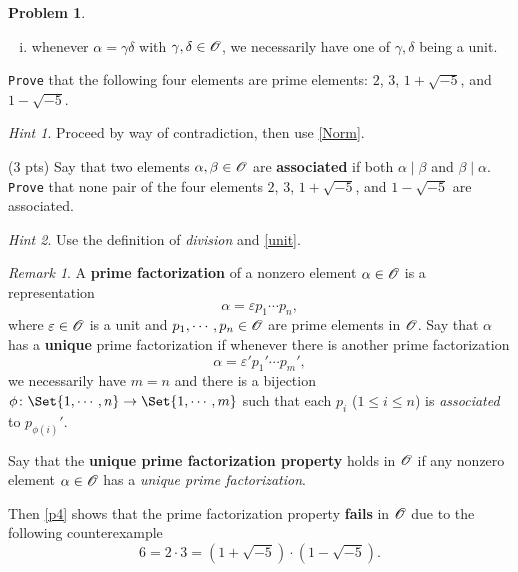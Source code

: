 \documentclass[11pt]{article}
\theoremstyle{plain}
\theoremstyle{definition}
\newtheorem{problem}{Problem}
\theoremstyle{remark}
\newtheorem*{remark}{Remark}
\newtheorem*{hint}{Hint}
\numberwithin{equation}{problem}
\begin{document}
\begin{problem}
\begin{listinprob}
\begin{enumerate}[(i)]
			\item whenever $\alpha=\gamma\delta$ with $\gamma, \delta \in \mathscr{O}$, we necessarily have one of $\gamma, \delta$ being a unit.
		\end{enumerate}
		\texttt{Prove} that the following four elements are prime elements: $2$, $3$, $1+\sqrt{-5}$, and $1-\sqrt{-5}$.
		\begin{hint}
			Proceed by way of contradiction, then use \cref{Norm}.
		\end{hint}
		\item (3 pts) Say that two elements $\alpha,\beta\in\mathscr{O}$ are \textbf{associated} if both $\alpha\mid\beta$ and $\beta\mid\alpha$. 
		\texttt{Prove} that none pair of the four elements $2$, $3$, $1+\sqrt{-5}$, and $1-\sqrt{-5}$ are associated. 
		\begin{hint}
			Use the definition of \emph{division} and \cref{unit}.
		\end{hint}
	\end{listinprob}
	\begin{remark}
		A \textbf{prime factorization} of a nonzero element $\alpha\in\mathscr{O}$ is a representation
		\[
			\alpha = \varepsilon p_1\cdots p_n,	
		\]
		where $\varepsilon\in\mathscr{O}$ is a unit and $p_1,\cdots,p_n\in\mathscr{O}$ are prime elements in $\mathscr{O}$. 
		Say that $\alpha$ has a \textbf{unique} prime factorization if whenever there is another prime factorization
		\[
			\alpha = \varepsilon' p_1'\cdots p_m', 
		\]
		we necessarily have $m=n$ and there is a bijection $\phi\colon\Set{1,\cdots,n}\to\Set{1,\cdots,m}$ such that each $p_i$ ($1\le i\le n$) is \emph{associated} to $p_{\phi(i)}'$.

		Say that the \textbf{unique prime factorization property} holds in $\mathscr{O}$ if any nonzero element $\alpha\in\mathscr{O}$ has a \emph{unique prime factorization}. 

		Then \cref{p4} shows that the prime factorization property \textbf{fails} in $\mathscr{O}$ due to the following counterexample
		\[
			6 = 2\cdot 3 = (1+\sqrt{-5})\cdot(1-\sqrt{-5}).
		\]
	\end{remark}
\end{problem}
\end{document}
